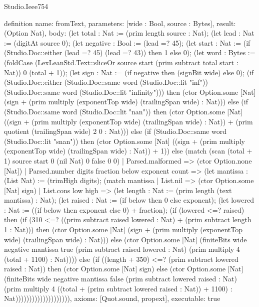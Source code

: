 \begin{lexlean}{Studio.Ieee754}
\begin{semanticmodule}
definition{
  name: fromText,
  parameters: [wide : Bool, source : Bytes],
  result: (Option Nat),
  body: (let total : Nat := (prim length source : Nat); (let lead : Nat := (digitAt source 0); (let negative : Bool := (lead =? 45); (let start : Nat := (if (Studio.Doc::either (lead =? 45) (lead =? 43)) then 1 else 0); (let word : Bytes := (foldCase (LexLeanStd.Text::sliceOr source start (prim subtract total start : Nat)) 0 (total + 1)); (let sign : Nat := (if negative then (signBit wide) else 0); (if (Studio.Doc::either (Studio.Doc::same word (Studio.Doc::lit "inf")) (Studio.Doc::same word (Studio.Doc::lit "infinity"))) then (ctor Option.some [Nat] (sign + (prim multiply (exponentTop wide) (trailingSpan wide) : Nat))) else (if (Studio.Doc::same word (Studio.Doc::lit "nan")) then (ctor Option.some [Nat] ((sign + (prim multiply (exponentTop wide) (trailingSpan wide) : Nat)) + (prim quotient (trailingSpan wide) 2 0 : Nat))) else (if (Studio.Doc::same word (Studio.Doc::lit "snan")) then (ctor Option.some [Nat] ((sign + (prim multiply (exponentTop wide) (trailingSpan wide) : Nat)) + 1)) else (match (scan (total + 1) source start 0 (nil Nat) 0 false 0 0)
    | Parsed.malformed => (ctor Option.none [Nat])
    | Parsed.number digits fraction below exponent count => (let mantissa : (List Nat) := (trimHigh digits); (match mantissa
      | List.nil => (ctor Option.some [Nat] sign)
      | List.cons low high => (let length : Nat := (prim length (text mantissa) : Nat); (let raised : Nat := (if below then 0 else exponent); (let lowered : Nat := ((if below then exponent else 0) + fraction); (if (lowered <=? raised) then (if (310 <=? ((prim subtract raised lowered : Nat) + (prim subtract length 1 : Nat))) then (ctor Option.some [Nat] (sign + (prim multiply (exponentTop wide) (trailingSpan wide) : Nat))) else (ctor Option.some [Nat] (finiteBits wide negative mantissa true (prim subtract raised lowered : Nat) (prim multiply 4 (total + 1100) : Nat)))) else (if ((length + 350) <=? (prim subtract lowered raised : Nat)) then (ctor Option.some [Nat] sign) else (ctor Option.some [Nat] (finiteBits wide negative mantissa false (prim subtract lowered raised : Nat) (prim multiply 4 ((total + (prim subtract lowered raised : Nat)) + 1100) : Nat)))))))))))))))))))),
  axioms: [Quot.sound, propext],
  executable: true
}

\end{semanticmodule}
\end{lexlean}
